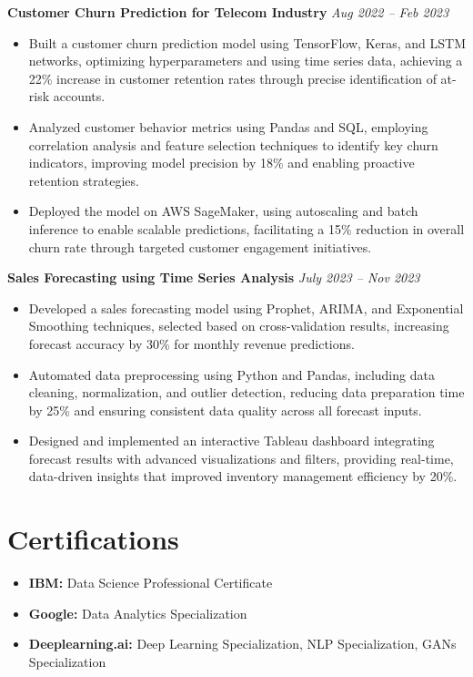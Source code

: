\documentclass[a4paper,10pt]{article}
\begin{document}
\noindent\textbf{Customer Churn Prediction for Telecom Industry} \hfill \textit{Aug 2022 – Feb 2023}
\begin{itemize}[leftmargin=*]
    \item Built a customer churn prediction model using TensorFlow, Keras, and LSTM networks, optimizing hyperparameters and using time series data, achieving a 22\% increase in customer retention rates through precise identification of at-risk accounts.
    \item Analyzed customer behavior metrics using Pandas and SQL, employing correlation analysis and feature selection techniques to identify key churn indicators, improving model precision by 18\% and enabling proactive retention strategies.
    \item Deployed the model on AWS SageMaker, using autoscaling and batch inference to enable scalable predictions, facilitating a 15\% reduction in overall churn rate through targeted customer engagement initiatives.
\end{itemize}

\vspace{0.1cm}

\noindent\textbf{Sales Forecasting using Time Series Analysis} \hfill \textit{July 2023 – Nov 2023}
\begin{itemize}[leftmargin=*]
    \item Developed a sales forecasting model using Prophet, ARIMA, and Exponential Smoothing techniques, selected based on cross-validation results, increasing forecast accuracy by 30\% for monthly revenue predictions.
    \item Automated data preprocessing using Python and Pandas, including data cleaning, normalization, and outlier detection, reducing data preparation time by 25\% and ensuring consistent data quality across all forecast inputs.
    \item Designed and implemented an interactive Tableau dashboard integrating forecast results with advanced visualizations and filters, providing real-time, data-driven insights that improved inventory management efficiency by 20\%.
\end{itemize}

\vspace{-0.3cm}

\section*{Certifications}
\begin{itemize}[leftmargin=*]
    \item \textbf{IBM:} Data Science Professional Certificate
    \item \textbf{Google:} Data Analytics Specialization
    \item \textbf{Deeplearning.ai:} Deep Learning Specialization, NLP Specialization, GANs Specialization
\end{itemize}
\end{document}

